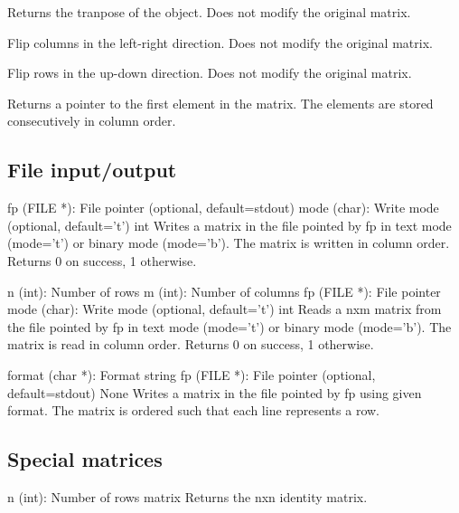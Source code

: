 {Returns the tranpose of the object. Does not modify the original matrix.}

{Flip columns in the left-right direction. Does not modify the original matrix.}

{Flip rows in the up-down direction. Does not modify the original matrix.}

{Returns a pointer to the first element in the matrix. The elements are stored consecutively in column order.}

\subsection{File input/output}

{fp (FILE *): File pointer (optional, default=stdout)\newline
mode (char): Write mode (optional, default='t')}
{int}
{Writes a matrix in the file pointed by fp in text mode (mode='t') or binary mode (mode='b').
The matrix is written in column order. Returns 0 on success, 1 otherwise.}

{n (int): Number of rows\newline
m (int): Number of columns\newline
fp (FILE *): File pointer\newline
mode (char): Write mode (optional, default='t')}
{int}
{Reads a nxm matrix from the file pointed by fp in text mode (mode='t') or binary mode (mode='b').
The matrix is read in column order. Returns 0 on success, 1 otherwise.}

{format (char *): Format string\newline
fp (FILE *): File pointer (optional, default=stdout)}
{None}
{Writes a matrix in the file pointed by fp using given format. The matrix is ordered such that
each line represents a row.}

\funcrefpagebreak
{}
\subsection{Special matrices}

{n (int): Number of rows}
{matrix}
{Returns the nxn identity matrix.}

